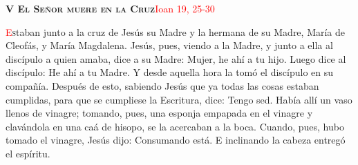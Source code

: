 \noindent\textbf{\textsc{V El Señor muere en la Cruz}}\hfill\textcolor{red}{Ioan 19, 25-30}

\vspace{0.25em}

\lettrine[lines=2]{\textcolor{red}{E}}staban junto a la cruz de Jesús su Madre y la hermana de su Madre, María de Cleofás, y María Magdalena. Jesús, pues, viendo a la Madre, y junto
a ella al discípulo a quien amaba, dice a su Madre: Mujer, he ahí a tu hijo. Luego dice al discípulo: He ahí a tu Madre. Y desde aquella hora la tomó el discípulo en su compañía.
Después de esto, sabiendo Jesús que ya todas las cosas estaban cumplidas, para que se cumpliese la Escritura, dice: Tengo sed. Había allí un vaso llenos de vinagre; tomando, pues,
una esponja empapada en el vinagre y clavándola en una caá de hisopo, se la acercaban a la boca. Cuando, pues, hubo tomado el vinagre, Jesús dijo: Consumando está. E inclinando la cabeza
entregó el espíritu.